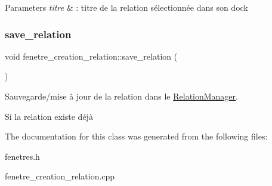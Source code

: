 \begin{DoxyParams}{Parameters}
{\em titre} & \+: titre de la relation sélectionnée dans son dock \\
\hline
\end{DoxyParams}
\mbox{\label{classfenetre__creation__relation_af9891e79cff26ef704cfdae9cfa46752}} 
\subsubsection{\texorpdfstring{save\+\_\+relation}{save\_relation}}
{\footnotesize\ttfamily void fenetre\+\_\+creation\+\_\+relation\+::save\+\_\+relation (\begin{DoxyParamCaption}{ }\end{DoxyParamCaption})\hspace{0.3cm}{\ttfamily [slot]}}



Sauvegarde/mise à jour de la relation dans le \hyperlink{class_relation_manager}{Relation\+Manager}. 

Si la relation existe déjà 

The documentation for this class was generated from the following files\+:\begin{DoxyCompactItemize}
\item 
fenetres.\+h\item 
fenetre\+\_\+creation\+\_\+relation.\+cpp\end{DoxyCompactItemize}
